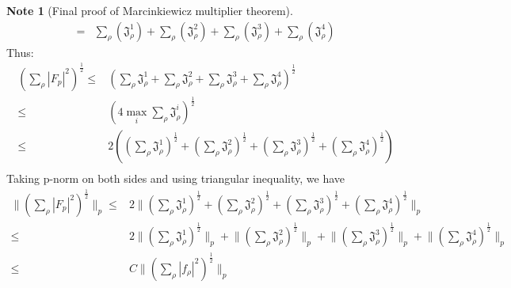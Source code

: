 \documentclass{report}
\theoremstyle{definition}
\newtheorem{note}{Note}
\theoremstyle{definition}
\theoremstyle{plain}
\numberwithin{theorem}{section}
\numberwithin{remark}{section}
\numberwithin{equation}{section}
\newcommand{\norm}[1]{\lVert#1\rVert}
\newcommand{\abs}[1]{\left\lvert#1\right\rvert}
\begin{document}
\begin{note}[Final proof of Marcinkiewicz multiplier theorem]
\begin{align*}
    =&\sum_\rho(\mathfrak{J}_\rho^1)+\sum_\rho(\mathfrak{J}_\rho^2)+\sum_\rho(\mathfrak{J}_\rho^3)+\sum_\rho(\mathfrak{J}_\rho^4)
\end{align*}
Thus:
\begin{align*}
    (\sum_\rho\abs{F_p}^2)^\frac{1}{2}\leq&(\sum_\rho\mathfrak{J}_\rho^1+\sum_\rho\mathfrak{J}_\rho^2+\sum_\rho\mathfrak{J}_\rho^3+\sum_\rho\mathfrak{J}_\rho^4)^\frac{1}{2}\\
    \leq&(4\max_i\sum_\rho\mathfrak{J}_\rho^i)^\frac{1}{2}\\
    \leq&2((\sum_\rho\mathfrak{J}_\rho^1)^\frac{1}{2}+(\sum_\rho\mathfrak{J}_\rho^2)^\frac{1}{2}+(\sum_\rho\mathfrak{J}_\rho^3)^\frac{1}{2}+(\sum_\rho\mathfrak{J}_\rho^4)^\frac{1}{2})\\
\end{align*}
Taking p-norm on both sides and using triangular inequality, we have
\begin{align*}
    \norm{(\sum_\rho\abs{F_p}^2)^\frac{1}{2}}_p\leq &2\norm{(\sum_\rho\mathfrak{J}_\rho^1)^\frac{1}{2}+(\sum_\rho\mathfrak{J}_\rho^2)^\frac{1}{2}+(\sum_\rho\mathfrak{J}_\rho^3)^\frac{1}{2}+(\sum_\rho\mathfrak{J}_\rho^4)^\frac{1}{2}}_p\\
    \leq &2\norm{(\sum_\rho\mathfrak{J}_\rho^1)^\frac{1}{2}}_p+\norm{(\sum_\rho\mathfrak{J}_\rho^2)^\frac{1}{2}}_p+\norm{(\sum_\rho\mathfrak{J}_\rho^3)^\frac{1}{2}}_p+\norm{(\sum_\rho\mathfrak{J}_\rho^4)^\frac{1}{2}}_p\\
    \leq& C\norm{(\sum_\rho\abs{f_\rho}^2)^\frac{1}{2}}_p
\end{align*}
\end{note}      
\end{document}
